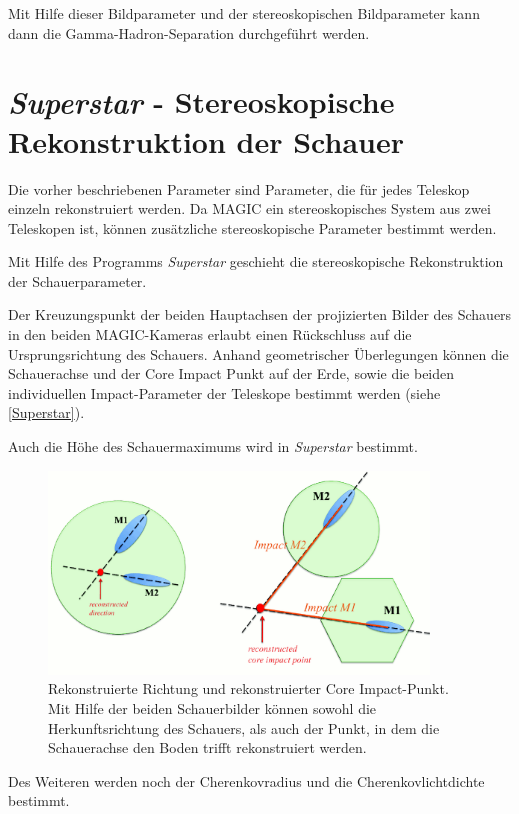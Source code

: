 Mit Hilfe dieser Bildparameter und der stereoskopischen Bildparameter kann dann die Gamma-Hadron-Separation durchgeführt werden.


\section{\textit{Superstar} - Stereoskopische Rekonstruktion der Schauer}
Die vorher beschriebenen Parameter sind Parameter, die für jedes Teleskop einzeln rekonstruiert werden. 
Da MAGIC ein stereoskopisches System aus zwei Teleskopen ist, können zusätzliche stereoskopische Parameter bestimmt werden.

Mit Hilfe des Programms \textit{Superstar} geschieht die stereoskopische Rekonstruktion der Schauerparameter.

Der Kreuzungspunkt der beiden Hauptachsen der projizierten Bilder des Schauers in den beiden MAGIC-Kameras erlaubt einen Rückschluss auf die Ursprungsrichtung des Schauers.
Anhand geometrischer Überlegungen können die Schauerachse und der Core Impact Punkt auf der Erde, sowie die beiden individuellen Impact-Parameter der Teleskope bestimmt werden (siehe \autoref{Superstar}).\cite{Superstar}

Auch die Höhe des Schauermaximums wird in \textit{Superstar} bestimmt.

\begin{figure}
    \centering
    \includegraphics[width=0.9\textwidth]{./Plots/03_MonteCarlos/Superstar.png}
    \caption{Rekonstruierte Richtung und rekonstruierter Core Impact-Punkt.
    Mit Hilfe der beiden Schauerbilder können sowohl die Herkunftsrichtung des Schauers, als auch der Punkt, in dem die Schauerachse den Boden trifft rekonstruiert werden.\cite{Superstar}}
    \label{Superstar}
\end{figure}

Des Weiteren werden noch der Cherenkovradius und die Cherenkovlichtdichte bestimmt.\cite{Superstar}

